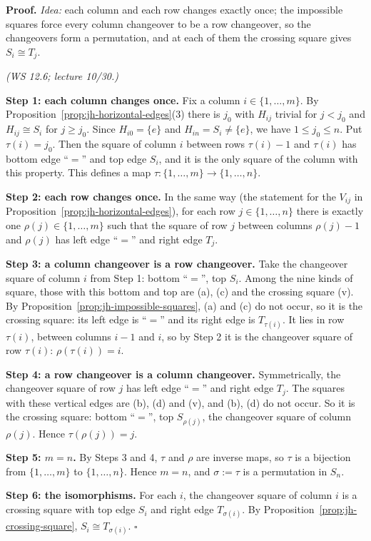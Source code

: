 \documentclass[11pt]{report}
\renewenvironment{proof}[1][Proof]{\noindent\textbf{#1.} }{\hfill$\square$\par\vspace{5pt}}
\begin{document}
\begin{proof}
\textit{Idea:} each column and each row changes exactly once; the impossible squares force every column changeover to be a row changeover, so the changeovers form a permutation, and at each of them the crossing square gives $S_i \cong T_j$.\par
\textit{(WS 12.6; lecture 10/30.)}

\textbf{Step 1: each column changes once.} Fix a column $i \in \{1, \ldots, m\}$. By Proposition~\ref{prop:jh-horizontal-edges}(3) there is $j_0$ with $H_{ij}$ trivial for $j < j_0$ and $H_{ij} \cong S_i$ for $j \geq j_0$. Since $H_{i0} = \{e\}$ and $H_{in} = S_i \neq \{e\}$, we have $1 \leq j_0 \leq n$. Put $\tau(i) = j_0$. Then the square of column $i$ between rows $\tau(i) - 1$ and $\tau(i)$ has bottom edge ``$=$'' and top edge $S_i$, and it is the only square of the column with this property. This defines a map $\tau : \{1, \ldots, m\} \to \{1, \ldots, n\}$.

\textbf{Step 2: each row changes once.} In the same way (the statement for the $V_{ij}$ in Proposition~\ref{prop:jh-horizontal-edges}), for each row $j \in \{1, \ldots, n\}$ there is exactly one $\rho(j) \in \{1, \ldots, m\}$ such that the square of row $j$ between columns $\rho(j) - 1$ and $\rho(j)$ has left edge ``$=$'' and right edge $T_j$.

\textbf{Step 3: a column changeover is a row changeover.} Take the changeover square of column $i$ from Step 1: bottom ``$=$'', top $S_i$. Among the nine kinds of square, those with this bottom and top are (a), (c) and the crossing square (v). By Proposition~\ref{prop:jh-impossible-squares}, (a) and (c) do not occur, so it is the crossing square: its left edge is ``$=$'' and its right edge is $T_{\tau(i)}$. It lies in row $\tau(i)$, between columns $i - 1$ and $i$, so by Step 2 it is the changeover square of row $\tau(i)$: $\rho(\tau(i)) = i$.

\textbf{Step 4: a row changeover is a column changeover.} Symmetrically, the changeover square of row $j$ has left edge ``$=$'' and right edge $T_j$. The squares with these vertical edges are (b), (d) and (v), and (b), (d) do not occur. So it is the crossing square: bottom ``$=$'', top $S_{\rho(j)}$, the changeover square of column $\rho(j)$. Hence $\tau(\rho(j)) = j$.

\textbf{Step 5: $m = n$.} By Steps 3 and 4, $\tau$ and $\rho$ are inverse maps, so $\tau$ is a bijection from $\{1, \ldots, m\}$ to $\{1, \ldots, n\}$. Hence $m = n$, and $\sigma := \tau$ is a permutation in $S_n$.

\textbf{Step 6: the isomorphisms.} For each $i$, the changeover square of column $i$ is a crossing square with top edge $S_i$ and right edge $T_{\sigma(i)}$. By Proposition~\ref{prop:jh-crossing-square}, $S_i \cong T_{\sigma(i)}$.
\end{proof}
\end{document}
